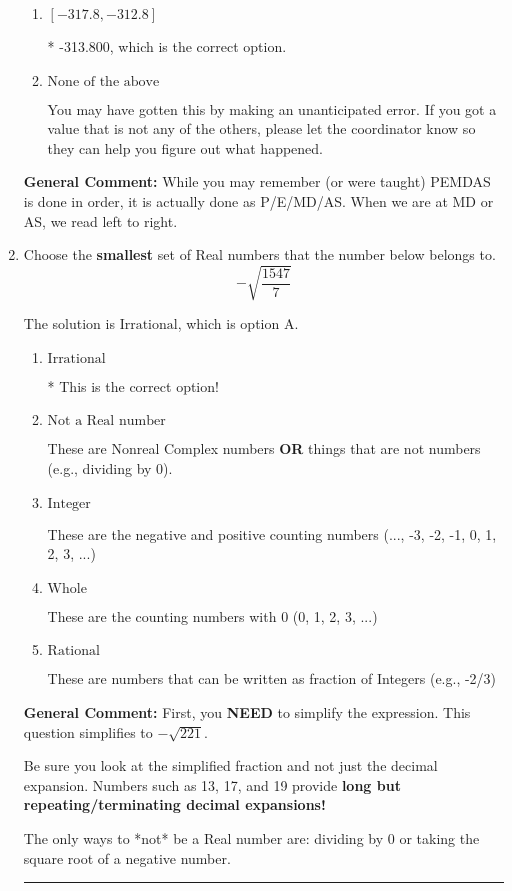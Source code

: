 \documentclass{extbook}[14pt]
\newcommand{\litem}[1]{\item #1

\rule{\textwidth}{0.4pt}}
\begin{document}
\begin{enumerate}
{\begin{enumerate}[label=\Alph*.]
 -196.000, which corresponds to not distributing a negative correctly.
\item \( [-317.8, -312.8] \)

* -313.800, which is the correct option.
\item \( \text{None of the above} \)

 You may have gotten this by making an unanticipated error. If you got a value that is not any of the others, please let the coordinator know so they can help you figure out what happened.
\end{enumerate}

\textbf{General Comment:} While you may remember (or were taught) PEMDAS is done in order, it is actually done as P/E/MD/AS. When we are at MD or AS, we read left to right.
}
\litem{
Choose the \textbf{smallest} set of Real numbers that the number below belongs to.
\[ -\sqrt{\frac{1547}{7}} \]

The solution is \( \text{Irrational} \), which is option A.\begin{enumerate}[label=\Alph*.]
\item \( \text{Irrational} \)

* This is the correct option!
\item \( \text{Not a Real number} \)

These are Nonreal Complex numbers \textbf{OR} things that are not numbers (e.g., dividing by 0).
\item \( \text{Integer} \)

These are the negative and positive counting numbers (..., -3, -2, -1, 0, 1, 2, 3, ...)
\item \( \text{Whole} \)

These are the counting numbers with 0 (0, 1, 2, 3, ...)
\item \( \text{Rational} \)

These are numbers that can be written as fraction of Integers (e.g., -2/3)
\end{enumerate}

\textbf{General Comment:} First, you \textbf{NEED} to simplify the expression. This question simplifies to $-\sqrt{221}$. 
 
 Be sure you look at the simplified fraction and not just the decimal expansion. Numbers such as 13, 17, and 19 provide \textbf{long but repeating/terminating decimal expansions!} 
 
 The only ways to *not* be a Real number are: dividing by 0 or taking the square root of a negative number. 
 
}
\end{enumerate}
\end{document}
